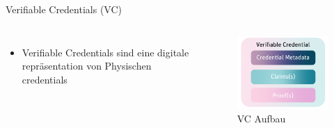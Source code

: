 \documentclass[
	ngerman,%
	authorontitle=true,
	]{bfhbeamer}
\begin{document}
\begin{frame}{Verifiable Credentials (VC)}
    \begin{columns}[onlytextwidth,T]

        \column{70mm}  
        \begin{itemize}
            \item Verifiable Credentials sind eine digitale repräsentation von Physischen credentials
        \end{itemize}

        \column{70mm}
        \begin{figure}
            \centering
            \includegraphics[width=70mm]{../img/VC.png}
            \caption{VC Aufbau}
        \end{figure}

    \end{columns}
\end{frame}
\end{document}
